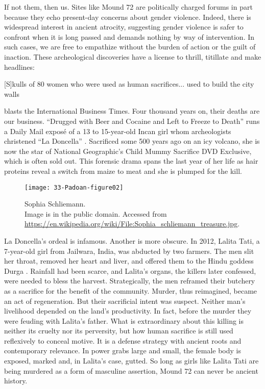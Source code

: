 If not them, then us. Sites like Mound 72 are politically charged forums in part because they echo present-day concerns about gender violence. Indeed, there is widespread interest in ancient atrocity, suggesting gender violence is safer to confront when it is long passed and demands nothing by way of intervention. In such cases, we are free to empathize without the burden of action or the guilt of inaction. These archeological discoveries have a license to thrill, titillate and make headlines: \begin{IJSRAquote}{\cite[]{osborne2013}}[S]kulls of 80 women who were used as human sacrifices... used to build the city walls\end{IJSRAquote}blasts the International Business Times. Four thousand years on, their deaths are our business. \enquote{Drugged with Beer and Cocaine and Left to Freeze to Death} runs a Daily Mail exposé of a 13 to 15-year-old Incan girl whom archeologists christened \enquote{La Doncella} \parencite[]{macrae2013}. Sacrificed some 500 years ago on an icy volcano, she is now the star of National Geographic's Child Mummy Sacrifice DVD Exclusive, which is often sold out. This forensic drama spans the last year of her life as hair proteins reveal a switch from maize to meat and she is plumped for the kill. 
\begin{wrapfigure}{O}[3cm]{0.5\textwidth} 	
	\centering
	\texttt{[image: 33-Padoan-figure02]}
	\caption{Sophia Schliemann.
		 {\normalfont\scriptsize \\ Image is in the public domain. Accessed from  \url{https://en.wikipedia.org/wiki/File:Sophia_schliemann_treasure.jpg}.}
		}
	\label{fig:33-Padoan-figure01}
\end{wrapfigure}

La Doncella's ordeal is infamous. Another is more obscure. In 2012, Lalita Tati, a 7-year-old girl from Jailwara, India, was abducted by two farmers. The men slit her throat, removed her heart and liver, and offered them to the Hindu goddess Durga \parencite{richards2012}. Rainfall had been scarce, and Lalita's organs, the killers later confessed, were needed to bless the harvest. Strategically, the men reframed their butchery as a sacrifice for the benefit of the community. Murder, thus reimagined, became an act of regeneration. But their sacrificial intent was suspect. Neither man's livelihood depended on the land's productivity. In fact, before the murder they were feuding with Lalita's father. What is extraordinary about this killing is neither its cruelty nor its perversity, but how human sacrifice is still used reflexively to conceal motive. It is a defense strategy with ancient roots and contemporary relevance. In power grabs large and small, the female body is exposed, marked and, in Lalita's case, gutted. So long as girls like Lalita Tati are being murdered as a form of masculine assertion, Mound 72 can never be ancient history. 

